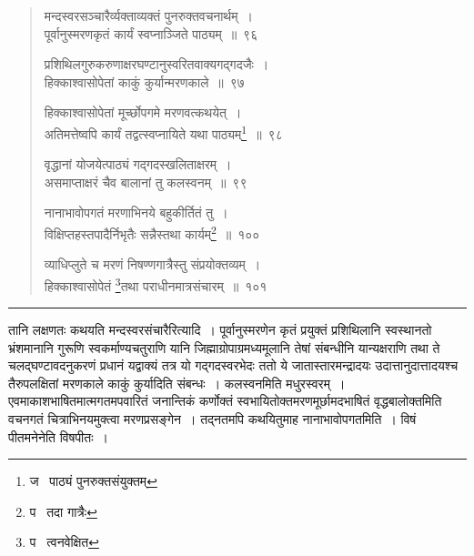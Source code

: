 \documentclass[11pt, openany]{book}
\begin{document}
\begin{quote}
{\na मन्दस्वरसञ्चारैर्व्यक्ताव्यक्तं पुनरुक्तवचनार्थम्~।\\
पूर्वानुस्मरणकृतं कार्यं स्वप्नाञ्जिते पाठ्यम्~॥~९६

प्रशिथिलगुरुकरुणाक्षरघण्टानुस्वरितवाक्यगद्गदजैः~।\\
हिक्काश्वासोपेतां काकुं कुर्यान्मरणकाले~॥~९७

हिक्काश्वासोपेतां मूर्च्छोपगमे मरणवत्कथयेत्~।\\
अतिमत्तेष्वपि कार्यं तद्वत्स्वप्नायिते यथा पाठ्यम्\renewcommand{\thefootnote}{1}\footnote{ज \textendash\  पाठ्यं पुनरुक्तसंयुक्तम्}~॥~९८

वृद्धानां योजयेत्पाठ्यं गद्गदस्खलिताक्षरम्~।\\
असमाप्ताक्षरं चैव बालानां तु कलस्वनम्~॥~९९

नानाभावोपगतं मरणाभिनये बहुकीर्तितं तु~।\\
विक्षिप्तहस्तपादैर्निभृतैः सन्नैस्तथा कार्यम्\renewcommand{\thefootnote}{2}\footnote{प \textendash\  तदा गात्रैः}~॥~१००

व्याधिप्लुते च मरणं निषण्णगात्रैस्तु संप्रयोक्तव्यम्~।\\
हिक्काश्वासोपेतं \renewcommand{\thefootnote}{3}\footnote{प \textendash\  त्वनवेक्षित}तथा पराधीनमात्रसंचारम्~॥~१०१}
\end{quote}

\hrule

\vspace{2mm}
\noindent
तानि लक्षणतः कथयति मन्दस्वरसंचारैरित्यादि~। पूर्वानुस्मरणेन कृतं प्रयुक्तं प्रशिथिलानि स्वस्थानतो भ्रंशमानानि गुरूणि स्वकर्माण्यचतुराणि यानि जिह्माग्रोपाग्रमध्यमूलानि तेषां संबन्धीनि यान्यक्षराणि तथा ते चलद्घण्टावदनुकरणं प्रधानं यद्वाक्यं तत्र यो गद्गदस्वरभेदः ततो ये जातास्तारमन्द्रादयः उदात्तानुदात्तादयश्च तैरुपलक्षितां मरणकाले काकुं कुर्यादिति संबन्धः~। कलस्वनमिति मधुरस्वरम्~।\\

एवमाकाशभाषितमात्मगतमपवारितं जनान्तिकं कर्णोक्तं स्वभायितोक्तमरणमूर्छामदभाषितं वृद्धबालोक्तमिति वचनगतं चित्राभिनयमुक्त्वा मरणप्रसङ्गेन~। तद्नतमपि कथयितुमाह नानाभावोपगतमिति~। विषं पीतमनेनेति विषपीतः~।

\newpage
\end{document}
